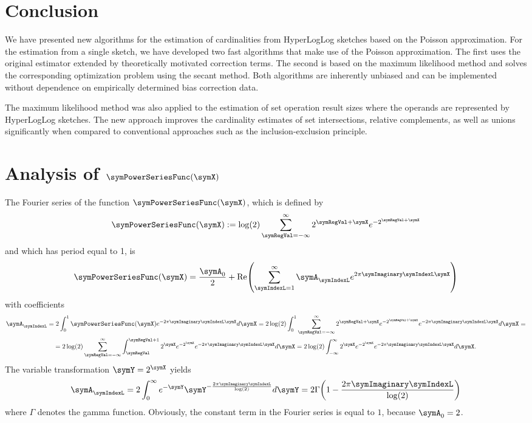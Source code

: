 \documentclass[a4paper]{scrartcl}
\renewcommand\Re{\operatorname{Re}}
\begin{document}
\section{Conclusion}
We have presented new algorithms for the estimation of cardinalities from HyperLogLog sketches based on the Poisson approximation. For the estimation from a single sketch, we have developed two fast algorithms that make use of the Poisson approximation. The first uses the original estimator extended by theoretically motivated correction terms. The second is based on the maximum likelihood method and solves the corresponding optimization problem using the secant method. Both algorithms are inherently unbiased and can be implemented without dependence on empirically determined bias correction data.

The maximum likelihood method was also applied to the estimation of set operation result sizes where the operands are represented by HyperLogLog sketches. The new approach improves the cardinality estimates of set intersections, relative complements, as well as unions significantly when compared to conventional approaches such as the inclusion-exclusion principle.
\appendix

\section{Analysis of $\symPowerSeriesFunc(\symX)$}
\label{app:analysis_xi}
The Fourier series of the function $\symPowerSeriesFunc(\symX)$, which is defined by
\begin{equation}
\label{equ:def_xi}
\symPowerSeriesFunc(\symX):= \log(2) \sum_{\symRegVal = -\infty}^\infty
2^{\symRegVal+\symX}
e^{-2^{\symRegVal+\symX}}
\end{equation}
and which has period equal to 1, is
\begin{equation}
\symPowerSeriesFunc(\symX) = \frac{\symA_0}{2} + \Re\!\left(\sum_{\symIndexL=1}^{\infty}
\symA_\symIndexL e^{2\pi\symImaginary\symIndexL\symX}\right)
\end{equation}
with coefficients
\begin{multline}
\symA_\symIndexL = 2\int_0^1 \symPowerSeriesFunc(\symX) e^{-2\pi\symImaginary\symIndexL\symX}d\symX
=
2\log(2)
\int_0^1
\sum_{\symRegVal = -\infty}^\infty
2^{\symRegVal+\symX}
e^{-2^{\symRegVal+\symX}}
e^{-2\pi\symImaginary\symIndexL\symX}
d\symX
=
\\
=
2\log(2)
\sum_{\symRegVal = -\infty}^\infty
\int_{\symRegVal}^{\symRegVal+1}
2^{\symX}
e^{-2^{\symX}}
e^{-2\pi\symImaginary\symIndexL\symX}
d\symX
=
2\log(2) \int_{-\infty}^{\infty} 2^\symX
e^{-2^\symX}
e^{-2\pi\symImaginary\symIndexL\symX}d\symX.
\end{multline}
The variable transformation $\symY = 2^\symX$ yields
\begin{equation}
\symA_\symIndexL
=
2\int_{0}^{\infty} e^{-\symY}
\symY^{-\frac{2\pi\symImaginary\symIndexL}{\log(2)}}d\symY
= 
2\Gamma\!\left(1-\frac{2\pi\symImaginary\symIndexL}{\log(2)}\right)
\end{equation}
where $\Gamma$ denotes the gamma function. Obviously, the constant term in the Fourier series is equal to $1$, because $\symA_0=2$. 
\end{document}
